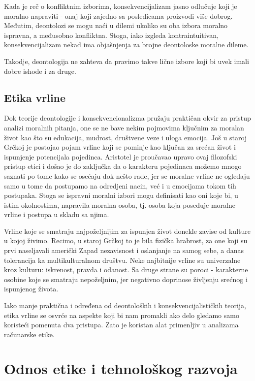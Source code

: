 \documentclass[a4paper]{article}
\begin{document}
Kada je reč o konfliktnim izborima, konsekvencijalizam jasno odlučuje koji je moralno napraviti - onaj koji zajedno sa posledicama proizvodi više dobrog. Međutim, deontolozi se mogu naći u dilemi ukoliko su oba izbora moralno ispravna, a međusobno konfliktna. Stoga, iako izgleda kontraintuitivan, konsekvencijalizam nekad ima objašnjenja za brojne deontoloske moralne dileme.

Takodje, deontologija ne zahteva da pravimo takve lične izbore koji bi uvek imali dobre ishode i za druge. 

\subsection{Etika vrline}

Dok teorije deontologije i konsekvencionalizma pružaju praktičan okvir za pristup analizi moralnih pitanja, one se ne bave nekim pojmovima ključnim za moralan život kao što su edukacija, mudrost, društvene veze i uloga emocija. 
Još u staroj Grčkoj je postojao pojam vrline koji se pominje kao ključan za srećan život i ispunjenje potencijala pojedinca.
Aristotel je proučavao upravo ovaj filozofski pristup etici i došao je do zaključka da o karakteru pojedinaca možemo mnogo saznati po tome kako se osećaju dok nešto rade, jer se moralne vrline ne ogledaju samo u tome da postupamo na odredjeni nacin, već i u emocijama tokom tih postupaka.
Stoga se ispravni moralni izbori mogu definisati kao oni koje bi, u istim okolnostima, napravila moralna osoba, tj. osoba koja poseduje moralne vrline i postupa u skladu sa njima.

Vrline koje se smatraju najpoželjnijim za ispunjen život donekle zavise od kulture u kojoj živimo.
Recimo, u staroj Grčkoj to je bila fizička hrabrost, za one koji su prvi naseljavali američki Zapad nezavisnost i oslanjanje na samog sebe, a danas tolerancija ka multikulturalnom društvu.
Neke najbitnije vrline su univerzalne kroz kulturu: iskrenost, pravda i odanost.
Sa druge strane su poroci - karakterne osobine koje se smatraju nepoželjnim, jer negativno doprinose življenju srećnog i ispunjenog života. 

Iako manje praktična i određena od deontoloških i konsekvencijalističkih teorija, etika vrline se osvrće na aspekte koji bi nam promakli ako delo gledamo samo koristeći pomenuta dva pristupa. Zato je koristan alat primenljiv u analizama računarske etike. 

\section{Odnos etike i tehnološkog razvoja}
\end{document}
